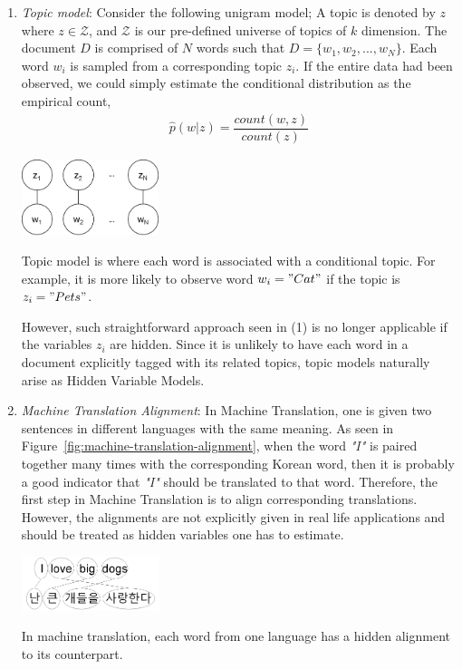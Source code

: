 \documentclass[justified, marginals=justified]{tufte-handout}
\theoremstyle{definition}
\begin{document}
\begin{enumerate}
	\item \textit{Topic model}: Consider the following unigram model; A topic is denoted by $z$ where $z\in\mathcal{Z}$, and $\mathcal{Z}$ is our pre-defined universe of topics of $k$ dimension. The document $D$ is comprised of $N$ words such that $D=\{w_1, w_2, ..., w_N\}$. Each word $w_i$ is sampled from a corresponding topic $z_i$. If the entire data had been observed, we could simply estimate the conditional distribution as the empirical count,
	\begin{align}
	\hat{p}(w|z) = \dfrac{count(w,z)}{count(z)}
	\end{align}
	
		\begin{marginfigure}[-3cm]%
			\centering
			\includegraphics[width=4cm]{topic-model-unigram.png}
			\caption{Topic model is where each word is associated with a conditional topic. For example, it is more likely to observe word $w_i="Cat"$ if the topic is $z_i="Pets"$.}
			\label{fig:topic-model-unigram}
		\end{marginfigure}
	
	However, such straightforward approach seen in (1) is no longer applicable if the variables $z_i$ are hidden. Since it is unlikely to have each word in a document explicitly tagged with its related topics, topic models naturally arise as Hidden Variable Models.
	
	\item \textit{Machine Translation Alignment}: 
	In Machine Translation, one is given two sentences in different languages with the same meaning. As seen in Figure~\ref{fig:machine-translation-alignment}, when the word \textit{"I"} is paired together many times with the corresponding Korean word, then it is probably a good indicator that \textit{"I"} should be translated to that word. Therefore, the first step in Machine Translation is to align corresponding translations. However, the alignments are not explicitly given in real life applications and should be treated as hidden variables one has to estimate. 
		\begin{marginfigure}[-3cm]%
			\centering
			\includegraphics[width=4cm]{machine-translation-alignment.png}
			\caption{In machine translation, each word from one language has a hidden alignment to its counterpart.}
			\label{fig:machine-translation-alignment}
		\end{marginfigure}	


\end{enumerate}
\end{document}
